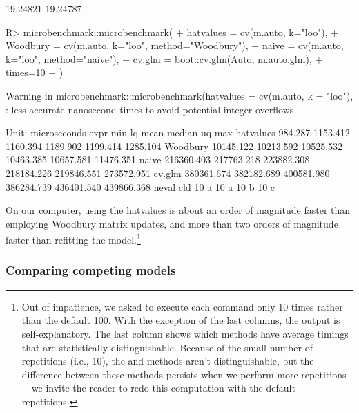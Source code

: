 \documentclass[
]{jss}
\begin{document}
\begin{CodeChunk}
\begin{CodeOutput}
[1] 19.24821 19.24787
\end{CodeOutput}
\begin{CodeInput}
R> microbenchmark::microbenchmark(
+   hatvalues = cv(m.auto, k="loo"),
+   Woodbury = cv(m.auto, k="loo", method="Woodbury"),
+   naive = cv(m.auto, k="loo", method="naive"),
+   cv.glm = boot::cv.glm(Auto, m.auto.glm),
+   times=10
+ )
\end{CodeInput}
\begin{CodeOutput}
Warning in microbenchmark::microbenchmark(hatvalues = cv(m.auto, k = "loo"), :
less accurate nanosecond times to avoid potential integer overflows
\end{CodeOutput}
\begin{CodeOutput}
Unit: microseconds
      expr        min         lq       mean     median         uq        max
 hatvalues    984.287   1153.412   1160.394   1189.902   1199.414   1285.104
  Woodbury  10145.122  10213.592  10525.532  10463.385  10657.581  11476.351
     naive 216360.403 217763.218 223882.308 218184.226 219846.551 273572.951
    cv.glm 380361.674 382182.689 400581.980 386284.739 436401.540 439866.368
 neval cld
    10 a  
    10 a  
    10  b 
    10   c
\end{CodeOutput}
\end{CodeChunk}

On our computer, using the hatvalues is about an order of magnitude
faster than employing Woodbury matrix updates, and more than two orders
of magnitude faster than refitting the model.\footnote{Out of
  impatience, we asked  to execute each command
  only 10 times rather than the default 100. With the exception of the
  last columns, the output is self-explanatory. The last column shows
  which methods have average timings that are statistically
  distinguishable. Because of the small number of repetitions (i.e.,
  10), the  and  methods aren't
  distinguishable, but the difference between these methods persists
  when we perform more repetitions---we invite the reader to redo this
  computation with the default  repetitions.}

\hypertarget{comparing-competing-models}{%
\subsubsection{Comparing competing
models}\label{comparing-competing-models}}
\end{document}
